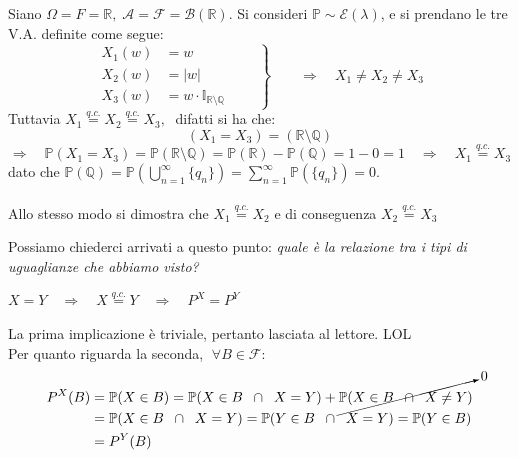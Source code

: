 \begin{esempio}
    Siano $\Omega = F = \mathbb{R}, \; \mathcal{A}= \mathcal{F} = \mathcal{B}(\mathbb{R})$. Si consideri $\mathbb{P} \sim \mathcal{E}(\lambda)$, e si prendano le tre V.A. definite come segue:
    \[\left.
    \begin{aligned}
        X_1(w) &= w \\
        X_2(w) &= |w|\\
        X_3(w) &= w\cdot\mathbb{I}_{\mathbb{R}\setminus\mathbb{Q}}
    \end{aligned}
    \qquad \right\} \qquad \Rightarrow \quad X_1\neq X_2\neq X_3
    \]
    Tuttavia $X_1 \overset{q.c.}{=}X_2\overset{q.c.}{=}X_3,\;$ difatti si ha che:
    \[(X_1 = X_3) = (\mathbb{R}\setminus\mathbb{Q})\]
    \[\Rightarrow\quad \mathbb{P}(X_1 = X_3) = \mathbb{P}(\mathbb{R}\setminus\mathbb{Q}) = \mathbb{P}(\mathbb{R}) - \mathbb{P}(\mathbb{Q}) = 1-0=1 \quad \Rightarrow\quad X_1 \overset{q.c.}{=}X_3\]
    dato che $\mathbb{P}(\mathbb{Q}) = \mathbb{P}(\bigcup_{n=1}^\infty\{q_n\}) = \sum_{n=1}^\infty \mathbb{P}(\{q_n\}) = 0$.\\
    \\
    Allo stesso modo si dimostra che $X_1 \overset{q.c.}{=}X_2$ e di conseguenza $X_2 \overset{q.c.}{=}X_3$
\end{esempio}

\newpage
\noindent Possiamo chiederci arrivati a questo punto: \textit{quale è la relazione tra i tipi di uguaglianze che abbiamo visto?}

\begin{proposizione}
    $X=Y\quad\Rightarrow\quad X\overset{q.c.}{=}Y \quad\Rightarrow\quad P^X=P^Y $
    \begin{dimostrazione}
        La prima implicazione è triviale, pertanto lasciata al lettore. LOL\\
        Per quanto riguarda la seconda, $\;\forall B\in \mathcal{F}$:
        \begin{align*}
            P^X(B) &= \mathbb{P}(X\in B) = \mathbb{P}(X\in B\;\; \cap\;\; X=Y) + \cancelto{0}{\mathbb{P}(X\in B\;\; \cap\;\; X\neq Y)}\\
            & = \mathbb{P}(X\in B\;\; \cap\;\; X=Y) = \mathbb{P}(Y\in B\;\; \cap\;\; X=Y) = \mathbb{P}(Y\in B)\\
            & = P^Y(B)
        \end{align*}
    \end{dimostrazione}
\end{proposizione}

